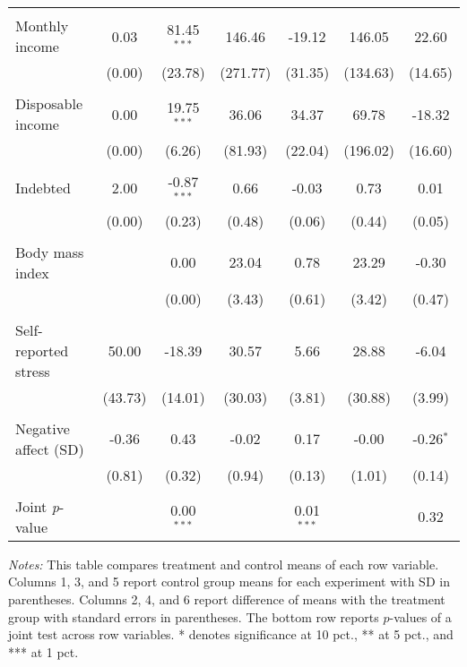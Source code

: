 \begin{table}[htbp]
{\begin{threeparttable}
\begin{tabular}{l*{6}{c}}
          &         &         &         &         &         &         \\
Monthly income&     0.03&81.45$^{***}$&   146.46&   -19.12&   146.05&    22.60\\
          &   (0.00)&  (23.78)& (271.77)&  (31.35)& (134.63)&  (14.65)\\
          &         &         &         &         &         &         \\
Disposable income&     0.00&19.75$^{***}$&    36.06&    34.37&    69.78&   -18.32\\
          &   (0.00)&   (6.26)&  (81.93)&  (22.04)& (196.02)&  (16.60)\\
          &         &         &         &         &         &         \\
Indebted  &     2.00&-0.87$^{***}$&     0.66&    -0.03&     0.73&     0.01\\
          &   (0.00)&   (0.23)&   (0.48)&   (0.06)&   (0.44)&   (0.05)\\
          &         &         &         &         &         &         \\
Body mass index&         &     0.00&    23.04&     0.78&    23.29&    -0.30\\
          &         &   (0.00)&   (3.43)&   (0.61)&   (3.42)&   (0.47)\\
          &         &         &         &         &         &         \\
Self-reported stress&    50.00&   -18.39&    30.57&     5.66&    28.88&    -6.04\\
          &  (43.73)&  (14.01)&  (30.03)&   (3.81)&  (30.88)&   (3.99)\\
          &         &         &         &         &         &         \\
Negative affect (SD)&    -0.36&     0.43&    -0.02&     0.17&    -0.00&-0.26$^{*}$\\
          &   (0.81)&   (0.32)&   (0.94)&   (0.13)&   (1.01)&   (0.14)\\
          &         &         &         &         &         &         \\
\midrule Joint \emph{p}-value&         &0.00$^{***}$&         &0.01$^{***}$&         &     0.32\\
\bottomrule \end{tabular} \begin{tablenotes}[flushleft] \footnotesize \item \emph{Notes:} This table compares treatment and control means of each row variable. Columns 1, 3, and 5 report control group means for each experiment with SD in parentheses. Columns 2, 4, and 6 report difference of means with the treatment group with standard errors in parentheses. The bottom row reports \(p\)-values of a joint test across row variables.  * denotes significance at 10 pct., ** at 5 pct., and *** at 1 pct. \end{tablenotes} \end{threeparttable} } \end{table}
